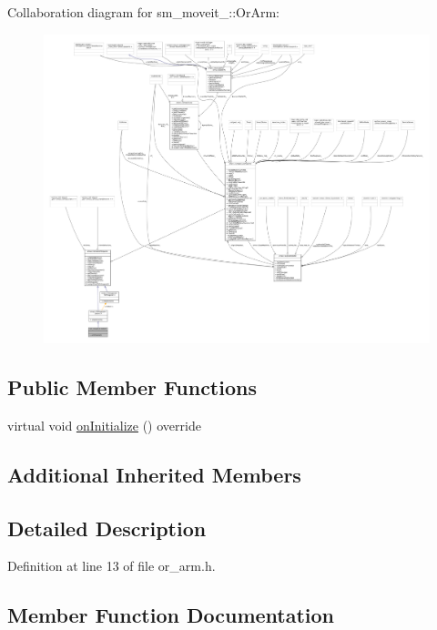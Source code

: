 Collaboration diagram for sm\+\_\+moveit\+\_\+:\+:Or\+Arm\+:
\nopagebreak
\begin{figure}[H]
\begin{center}
\leavevmode
\includegraphics[width=350pt]{classsm__moveit__4_1_1OrArm__coll__graph}
\end{center}
\end{figure}
\subsection*{Public Member Functions}
\begin{DoxyCompactItemize}
\item 
virtual void \hyperlink{classsm__moveit__4_1_1OrArm_a9269c0a4712d81a1ee18640c66fef0ff}{on\+Initialize} () override
\end{DoxyCompactItemize}
\subsection*{Additional Inherited Members}


\subsection{Detailed Description}


Definition at line 13 of file or\+\_\+arm.\+h.



\subsection{Member Function Documentation}
\mbox{\label{classsm__moveit__4_1_1OrArm_a9269c0a4712d81a1ee18640c66fef0ff}} 
